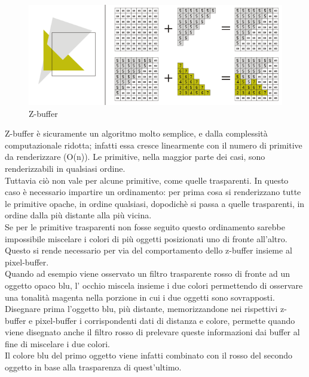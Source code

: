 \begin{figure}[htb]
 \centering
 \includegraphics[width=0.8\linewidth]{images/chapter_stato_arte/stato_arte_z_buffer.png}\hfill
 \caption[Z-buffer]{Z-buffer}
 \label{fig:stato_arte_z_buffer}
\end{figure}
Z-buffer è sicuramente un algoritmo molto semplice, e dalla complessità computazionale ridotta; infatti essa cresce linearmente con il numero di primitive da renderizzare (O(n)). Le primitive, nella maggior parte dei casi, sono renderizzabili in qualsiasi ordine.
\\
Tuttavia ciò non vale per alcune primitive, come quelle trasparenti. In questo caso è necessario impartire un ordinamento: per prima cosa si renderizzano tutte le primitive opache, in ordine qualsiasi, dopodichè si passa a quelle trasparenti, in ordine dalla più distante alla più vicina.
\\
Se per le primitive trasparenti non fosse seguito questo ordinamento sarebbe impossibile miscelare i colori di più oggetti posizionati uno di fronte all’altro. Questo si rende necessario per via del comportamento dello z-buffer insieme al pixel-buffer.
\\
Quando ad esempio viene osservato un filtro trasparente rosso di fronte ad un oggetto opaco blu, l’ occhio miscela insieme i due colori permettendo di osservare una tonalità magenta nella porzione in cui i due oggetti sono sovrapposti.
\\
Disegnare prima l’oggetto blu, più distante, memorizzandone nei rispettivi z-buffer e pixel-buffer i corrispondenti dati di distanza e colore, permette quando viene disegnato anche il filtro rosso di prelevare queste informazioni dai buffer al fine di miscelare i due colori.
\\
Il colore blu del primo oggetto viene infatti combinato con il rosso del secondo oggetto in base alla trasparenza di quest’ultimo.
\newpage
